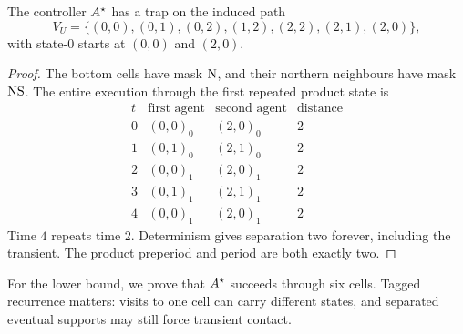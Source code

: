 \begin{lemma}\label{a:trap}
The controller $A^{\star}$ has a trap on the induced path
\[
 V_U=\{(0,0),(0,1),(0,2),(1,2),(2,2),(2,1),(2,0)\},
\]
with state-$0$ starts at $(0,0)$ and $(2,0)$.
\end{lemma}
\begin{proof}
The bottom cells have mask $\mathrm{N}$, and their northern neighbours have mask $\mathrm{N}\mathrm{S}$. The entire execution through the first repeated product state is
\[
\begin{array}{c|c|c|c}
t&\text{first agent}&\text{second agent}&\text{distance}\\\hline
0&(0,0)_0&(2,0)_0&2\\
1&(0,1)_0&(2,1)_0&2\\
2&(0,0)_1&(2,0)_1&2\\
3&(0,1)_1&(2,1)_1&2\\
4&(0,0)_1&(2,0)_1&2
\end{array}
\]
Time $4$ repeats time $2$. Determinism gives separation two forever, including the transient. The product preperiod and period are both exactly two.
\end{proof}



For the lower bound, we prove that $A^{\star}$ succeeds through six cells. Tagged recurrence matters: visits to one cell can carry different states, and separated eventual supports may still force transient contact.
